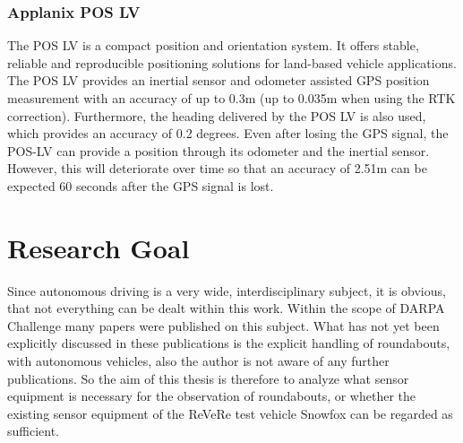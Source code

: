 \subsubsection{Applanix POS LV}
The POS LV is a compact position and orientation system. It offers stable, reliable and reproducible positioning solutions for land-based vehicle applications. The POS LV provides an inertial sensor and odometer assisted GPS position measurement with an accuracy of up to 0.3m (up to 0.035m when using the RTK correction).
Furthermore, the heading delivered by the POS LV is also used, which provides an accuracy of 0.2 degrees. Even after losing the GPS signal,
the POS-LV can provide a position through its odometer and the inertial sensor. However, this will deteriorate over time so that an accuracy of 2.51m
can be expected 60 seconds after the GPS signal is lost. \cite{manAP}


\section{Research Goal}
Since autonomous driving is a very wide, interdisciplinary subject, it is obvious, that not everything can be dealt within this work.
Within the scope of \acs{DARPA} Challenge many papers were published on this subject. What has not yet been explicitly discussed in these publications
is the explicit handling of roundabouts, with autonomous vehicles, also the author is not aware of any further publications. 
So the aim of this thesis is therefore to analyze what sensor equipment is necessary for the observation of roundabouts,
or whether the existing sensor equipment of the ReVeRe test vehicle Snowfox can be regarded as sufficient.

